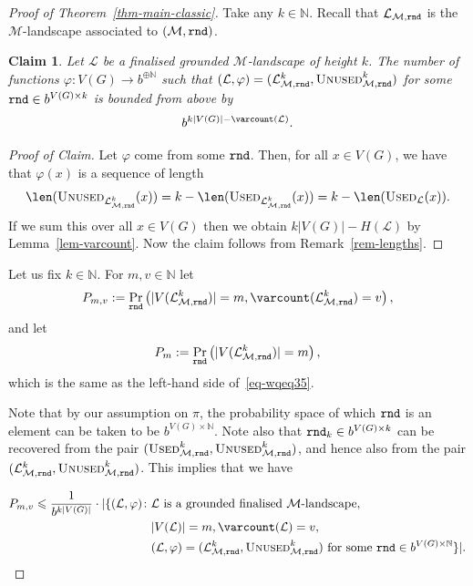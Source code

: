 \documentclass[12pt,a4paper]{article}
\numberwithin{equation}{section}
\newtheorem*{claim*}{Claim}
\theoremstyle{definition}
\renewcommand{\phi}{{\varphi}}
\renewcommand{\le}{\leqslant}
\newcommand\NN{\mathbb N}
\renewcommand{\cal}[1]{{\mathcal #1}}
\newcommand\MT{\operatorname{M}}
\newcommand{\used}{\textsc{Used}}
\newcommand{\unused}{\textsc{Unused}}
\begin{document}
    \begin{proof}[Proof of Theorem~\ref{thm-main-classic}] Take any $k\in \NN$. Recall that $\cal L_{\cal M,\rnd}$ is the $\cal M$-landscape associated to $(\cal M,\rnd)$. 
    
    \begin{claim*}
    Let $\cal L$ be a finalised grounded $\cal M$-landscape of height $k$. The number of functions $\phi\colon V(G)\to b^{\oplus \NN}$ such that $(\cal L,\phi) = (\cal L^k_{\cal M,\rnd}, \unused^k_{\cal M, \rnd})$ for some $\normalfont{\texttt{rnd}}\in b^{V(G)\times k}$ is bounded from above by 
    $$
    b^{k|V(G)|- \varcount(\cal L)}.
    $$
    \end{claim*}
    \begin{proof}[Proof of Claim]
    Let $\phi$ come from some $\normalfont{\texttt{rnd}}$. Then, for all $x\in V(G)$, we have that $\phi(x)$ is a sequence of length 
    $$ 
    \len(\unused_{\cal L^k_{\cal M,\rnd}}(x)) = k - \len(\used_{\cal L^k_{\cal M,\rnd}}(x)) = k -\len(\used_{\cal L}(x)).
    $$
    If we sum this over all $x\in V(G)$ then we obtain $k|V(G)|-H(\cal L)$ by Lemma~\ref{lem-varcount}. Now the claim follows from Remark~\ref{rem-lengths}.
    \end{proof}
    
    Let us fix $k\in \NN$. For $m,v\in \NN$ let
    $$
    P_{m,v}:= \Pr_{\rnd} \left(|V(\cal L^k_{\cal M, \rnd})| = m, \varcount(\cal L^k_{\cal M,\rnd})=v\right),
    $$
    and let 
    $$
    P_m :=  \Pr_{\rnd} \left(|V(\cal L^k_{\cal M, \rnd})| = m\right),
    $$
    which is the same as the left-hand side of~\eqref{eq-wqeq35}.
    
    Note that by our assumption on $\pi$, the probability space of which 
    $\normalfont{\texttt{rnd}}$ is an element can be taken to be $b^{V(G)\times \NN}$. Note also 
    that $\normalfont{\texttt{rnd}}_k\in b^{V(G)\times k}$ can be recovered from the 
    pair $(\used^k_{\cal M,\rnd}, \unused^k_{\cal M,\rnd})$, and hence also 
    from the pair $(\cal L^k_{\cal M,\rnd}, \unused^k_{\cal M, \rnd})$.  
    This implies that we have
    
    \begin{align}\label{eq-classic-problem}
     P_{m,v} \le \frac{1}{b^{k|V(G)|}}\cdot |\{(\cal L,\phi)\colon &\text{$\cal L$ is a grounded finalised $\cal M$-landscape,}
    \\
    &|V(\cal L)| = m, \varcount(\cal L)=v,  
    \notag
    \\
    &\text{$(\cal L,\phi) = (\cal L^k_{\cal M,\rnd}, \unused^k_{\cal M, \rnd})$ for some $\rnd\in b^{V(G)\times \NN }$}\}|. 
    \notag
    \end{align}
    

\end{proof}
\end{document}
